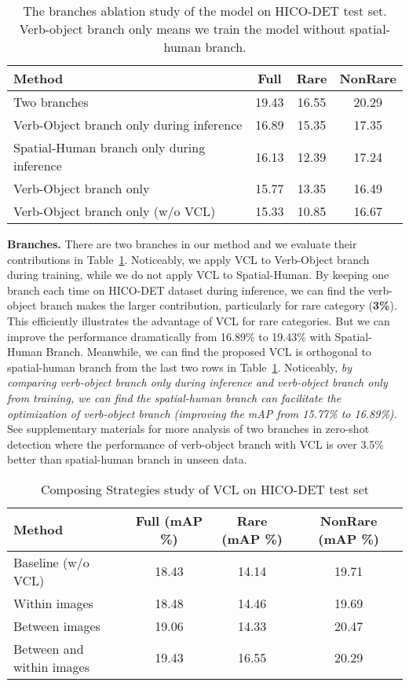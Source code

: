 \documentclass[runningheads]{llncs}
\begin{document}
\setlength{\tabcolsep}{4pt}
\begin{table}
\begin{center}
\caption{The branches ablation study of the model on HICO-DET test set. Verb-object branch only means we train the model without spatial-human branch.
  }
  \label{table:branch}
\small
\begin{tabular}{lccc}
\hline
Method &  Full  & Rare  & NonRare \\
\hline\hline
Two branches & 19.43 & 16.55 & 20.29 \\
Verb-Object branch only during inference & 16.89 & 15.35 & 17.35 \\
Spatial-Human branch only during inference & 16.13 & 12.39 & 17.24 \\
Verb-Object branch only & 15.77 & 13.35 & 16.49 \\
Verb-Object branch only (w/o VCL) & 15.33 & 10.85 & 16.67 \\
\hline
\end{tabular}
\end{center}
\end{table}
\setlength{\tabcolsep}{1.4pt}
{\bf Branches.} There are two branches in our method and we evaluate their contributions in Table~\ref{table:branch}. Noticeably, we apply VCL to Verb-Object branch during training, while we do not apply VCL to Spatial-Human. By keeping one branch each time on HICO-DET dataset during inference, we can find the verb-object branch makes the larger contribution, particularly for rare category ({\bf 3\%}). This efficiently illustrates the advantage of VCL for rare categories. But we can improve the performance dramatically from 16.89\% to 19.43\% with Spatial-Human Branch. Meanwhile, we can find the proposed VCL is orthogonal to spatial-human branch from the last two rows in Table~\ref{table:branch}. Noticeably, \textit{by comparing verb-object branch only during inference and verb-object branch only from training, we can find the spatial-human branch can facilitate the optimization of verb-object branch (improving the mAP from 15.77\% to 16.89\%)}. See supplementary materials for more analysis of two branches in zero-shot detection where the performance of verb-object branch with VCL is over 3.5\% better than spatial-human branch in unseen data.

\setlength{\tabcolsep}{4pt}
\begin{table}
\begin{center}
  \caption{Composing Strategies study of VCL on HICO-DET test set
  }
  \label{table:compose_strategy}
\small
\begin{tabular}{lccc}
\hline
Method &  Full (mAP \%)  & Rare (mAP \%)  & NonRare (mAP \%)  \\
\hline\hline
Baseline (w/o VCL) & 18.43 & 14.14 & 19.71 \\
Within images & 18.48 & 14.46 & 19.69 \\
Between images & 19.06 & 14.33 & 20.47 \\
Between and within images & 19.43 & 16.55 & 20.29 \\
\hline
\end{tabular}
\end{center}
\end{table}
\setlength{\tabcolsep}{1.4pt}
\end{document}
